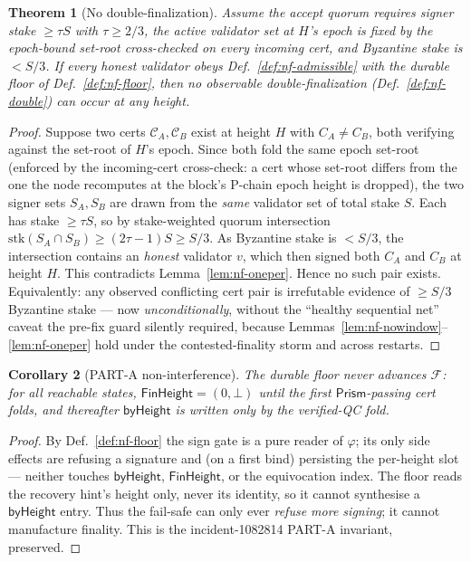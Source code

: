 \documentclass[11pt]{article}
\newtheorem{theorem}{Theorem}
\newtheorem{corollary}[theorem]{Corollary}
\begin{document}
\begin{theorem}[No double-finalization]
\label{thm:nodoublefinal}
Assume the accept quorum requires signer stake $\ge \tau S$ with
$\tau \ge 2/3$, the active validator set at $H$'s epoch is fixed by the
epoch-bound set-root cross-checked on every incoming cert, and Byzantine
stake is $< S/3$. If every honest validator obeys
Def.~\ref{def:nf-admissible} with the durable floor of
Def.~\ref{def:nf-floor}, then no observable double-finalization
(Def.~\ref{def:nf-double}) can occur at any height.
\end{theorem}
\begin{proof}
Suppose two certs $\mathcal{C}_A, \mathcal{C}_B$ exist at height $H$ with
$C_A \ne C_B$, both verifying against the set-root of $H$'s epoch. Since
both fold the same epoch set-root (enforced by the incoming-cert
cross-check: a cert whose set-root differs from the one the node
recomputes at the block's P-chain epoch height is dropped), the two
signer sets $S_A, S_B$ are drawn from the \emph{same} validator set of
total stake $S$. Each has stake $\ge \tau S$, so by stake-weighted
quorum intersection
$\mathrm{stk}(S_A \cap S_B) \ge (2\tau - 1)S \ge S/3$. As Byzantine
stake is $< S/3$, the intersection contains an \emph{honest} validator
$v$, which then signed both $C_A$ and $C_B$ at height $H$. This
contradicts Lemma~\ref{lem:nf-oneper}. Hence no such pair exists.
Equivalently: any observed conflicting cert pair is irrefutable evidence
of $\ge S/3$ Byzantine stake --- now \emph{unconditionally}, without the
``healthy sequential net'' caveat the pre-fix guard silently required,
because Lemmas~\ref{lem:nf-nowindow}--\ref{lem:nf-oneper} hold under the
contested-finality storm and across restarts.
\end{proof}

\begin{corollary}[PART-A non-interference]
\label{cor:nf-parta}
The durable floor never advances $\mathcal{F}$: for all reachable
states, $\mathsf{FinHeight} = (0,\bot)$ until the first
$\mathsf{Prism}$-passing cert folds, and thereafter $\mathsf{byHeight}$
is written only by the verified-QC fold.
\end{corollary}
\begin{proof}
By Def.~\ref{def:nf-floor} the sign gate is a pure reader of $\varphi$;
its only side effects are refusing a signature and (on a first bind)
persisting the per-height slot --- neither touches $\mathsf{byHeight}$,
$\mathsf{FinHeight}$, or the equivocation index. The floor reads the
recovery hint's height only, never its identity, so it cannot synthesise
a $\mathsf{byHeight}$ entry. Thus the fail-safe can only ever
\emph{refuse more signing}; it cannot manufacture finality. This is the
incident-1082814 PART-A invariant, preserved.
\end{proof}
\end{document}

